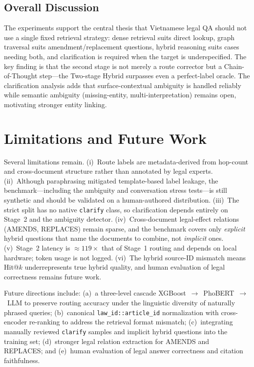 ﻿\documentclass[11pt,twocolumn]{article}
\begin{document}
\subsection{Overall Discussion}
\label{subsec:discussion}

The experiments support the central thesis that Vietnamese legal QA should
not use a single fixed retrieval strategy: dense retrieval suits direct
lookup, graph traversal suits amendment/replacement questions, hybrid
reasoning suits cases needing both, and clarification is required when the
target is underspecified. The key finding is that the second stage is not
merely a route corrector but a Chain-of-Thought step---the Two-stage Hybrid
surpasses even a perfect-label oracle. The clarification analysis adds that
surface-contextual ambiguity is handled reliably while semantic ambiguity
(missing-entity, multi-interpretation) remains open, motivating stronger
entity linking.

\section{Limitations and Future Work}
\label{sec:limitations}

Several limitations remain. (i)~Route labels are metadata-derived from
hop-count and cross-document structure rather than annotated by legal
experts. (ii)~Although paraphrasing mitigated template-based label leakage,
the benchmark---including the ambiguity and conversation stress tests---is
still synthetic and should be validated on a human-authored distribution.
(iii)~The strict split has no native \texttt{clarify} class, so
clarification depends entirely on Stage~2 and the ambiguity detector.
(iv)~Cross-document legal-effect relations (\textsc{AMENDS},
\textsc{REPLACES}) remain sparse, and the benchmark covers only
\emph{explicit} hybrid questions that name the documents to combine, not
\emph{implicit} ones. (v)~Stage~2 latency is $\approx\!119\times$ that of
Stage~1 routing and depends on local hardware; token usage is not logged.
(vi)~The hybrid source-ID mismatch means Hit@$k$ underrepresents true
hybrid quality, and human evaluation of legal correctness remains future
work.

Future directions include: (a)~a three-level cascade
XGBoost~$\rightarrow$~PhoBERT~$\rightarrow$~LLM to preserve routing
accuracy under the linguistic diversity of naturally phrased queries;
(b)~canonical \texttt{law\_id::article\_id} normalization with
cross-encoder re-ranking to address the retrieval format mismatch;
(c)~integrating manually reviewed \texttt{clarify} samples and implicit
hybrid questions into the training set; (d)~stronger legal relation
extraction for \textsc{AMENDS} and \textsc{REPLACES}; and (e)~human
evaluation of legal answer correctness and citation faithfulness.
\end{document}
